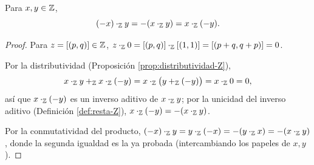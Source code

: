 \documentclass[12pt,a4paper]{book}
\begin{document}
    \begin{lema}
        \label{lem:regla-signos-Z}
        Para $x,y\in\mathbb{Z}$,
        \begin{equation*}
            (-x)\cdot_{\mathbb{Z}}y = -(x\cdot_{\mathbb{Z}}y) = x\cdot_{\mathbb{Z}}(-y).
        \end{equation*}
    \end{lema}
    \begin{proof}
        Para $z=[(p,q)]\in\mathbb{Z}$, $z\cdot_{\mathbb{Z}}0=[(p,q)]\cdot_{\mathbb{Z}}[(1,1)]=[(p+q,q+p)]=0$.

        Por la distributividad (Proposición \ref{prop:distributividad-Z}),
        \begin{equation*}
            x\cdot_{\mathbb{Z}}y+_{\mathbb{Z}}x\cdot_{\mathbb{Z}}(-y) = x\cdot_{\mathbb{Z}}\big(y+_{\mathbb{Z}}(-y)\big) = x\cdot_{\mathbb{Z}}0 = 0,
        \end{equation*}
        así que $x\cdot_{\mathbb{Z}}(-y)$ es un inverso aditivo de $x\cdot_{\mathbb{Z}}y$; por la unicidad del inverso aditivo (Definición \ref{def:resta-Z}), $x\cdot_{\mathbb{Z}}(-y)=-(x\cdot_{\mathbb{Z}}y)$.

        Por la conmutatividad del producto, $(-x)\cdot_{\mathbb{Z}}y=y\cdot_{\mathbb{Z}}(-x)=-(y\cdot_{\mathbb{Z}}x)=-(x\cdot_{\mathbb{Z}}y)$, donde la segunda igualdad es la ya probada (intercambiando los papeles de $x,y$).
    \end{proof}
\end{document}
